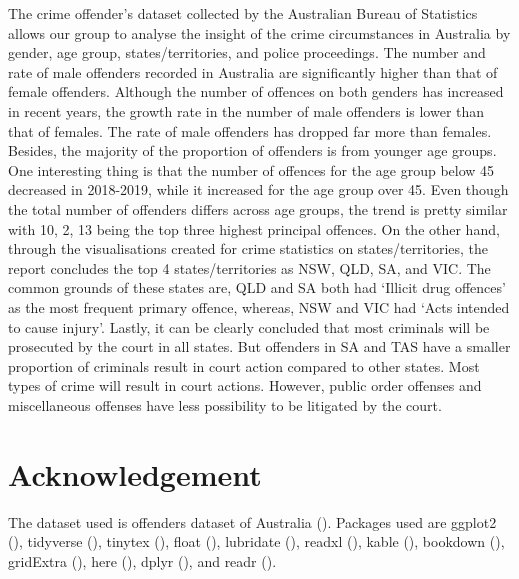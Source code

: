 \documentclass[11pt,a4paper,]{article}
\begin{document}
The crime offender's dataset collected by the Australian Bureau of Statistics allows our group to analyse the insight of the crime circumstances in Australia by gender, age group, states/territories, and police proceedings. The number and rate of male offenders recorded in Australia are significantly higher than that of female offenders. Although the number of offences on both genders has increased in recent years, the growth rate in the number of male offenders is lower than that of females. The rate of male offenders has dropped far more than females. Besides, the majority of the proportion of offenders is from younger age groups. One interesting thing is that the number of offences for the age group below 45 decreased in 2018-2019, while it increased for the age group over 45. Even though the total number of offenders differs across age groups, the trend is pretty similar with 10, 2, 13 being the top three highest principal offences. On the other hand, through the visualisations created for crime statistics on states/territories, the report concludes the top 4 states/territories as NSW, QLD, SA, and VIC. The common grounds of these states are, QLD and SA both had `Illicit drug offences' as the most frequent primary offence, whereas, NSW and VIC had `Acts intended to cause injury'. Lastly, it can be clearly concluded that most criminals will be prosecuted by the court in all states. But offenders in SA and TAS have a smaller proportion of criminals result in court action compared to other states. Most types of crime will result in court actions. However, public order offenses and miscellaneous offenses have less possibility to be litigated by the court.

\hypertarget{acknowledgement}{%
\section{Acknowledgement}\label{acknowledgement}}

The dataset used is offenders dataset of Australia (\textcite{ABS}).
Packages used are ggplot2 (\textcite{ggplot2}), tidyverse (\textcite{tidyverse}), tinytex (\textcite{tinytex}), float (\textcite{float}), lubridate (\textcite{lubridate}), readxl (\textcite{readxl}), kable (\textcite{kable}), bookdown (\textcite{bookdown}), gridExtra (\textcite{gridExtra}), here (\textcite{here}), dplyr (\textcite{dplyr}), and readr (\textcite{readr}).

\newpage

\printbibliography[title=Reference]
\end{document}
